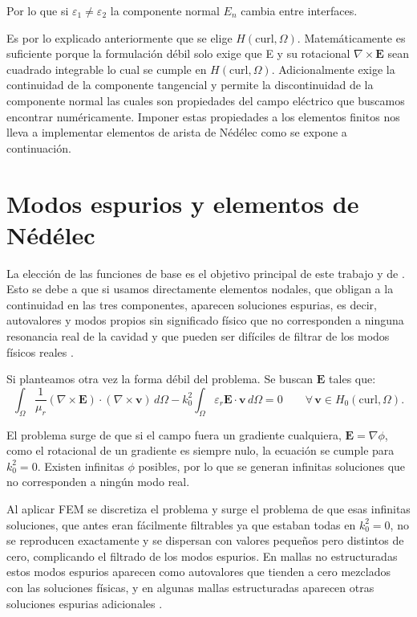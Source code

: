 \documentclass[12pt]{report} %
\begin{document}
Por lo que si $\varepsilon_1\neq\varepsilon_2$ la componente normal $E_n$ cambia entre interfaces.

Es por lo explicado anteriormente que se elige $H(\mathrm{curl},\Omega)$. Matemáticamente es suficiente porque la formulación débil solo exige que E y su rotacional $\nabla\times\mathbf{E}$ sean cuadrado integrable lo cual se cumple en $H(\mathrm{curl},\Omega)$. Adicionalmente exige la continuidad de la componente tangencial y permite la discontinuidad de la componente normal las cuales son propiedades del campo eléctrico que buscamos encontrar numéricamente. Imponer estas propiedades a los elementos finitos nos lleva a implementar elementos de arista de Nédélec como se expone a continuación.

\section{Modos espurios y elementos de Nédélec}\label{sec:nedelec}

La elección de las funciones de base es el objetivo principal de este trabajo y de \cite{amor2023hexahedral}. Esto se debe a que si usamos directamente elementos nodales, que obligan a la continuidad en las tres componentes, aparecen soluciones espurias, es decir, autovalores y modos propios sin significado f\'isico que no corresponden a ninguna resonancia real de la cavidad y que pueden ser difíciles de filtrar de los modos físicos reales \cite{jacobsson2007nedelec}.

Si planteamos otra vez la forma débil del problema. Se buscan $\mathbf{E}$ tales que:
\begin{equation}\label{eq:forma-debil-h0-nedelec}
	\int_\Omega \frac{1}{\mu_r} (\nabla\times\mathbf{E})\cdot(\nabla\times\mathbf{v})\,d\Omega
	- k_0^2 \int_\Omega \varepsilon_r \mathbf{E}\cdot\mathbf{v}\,d\Omega = 0
	\qquad \forall\,\mathbf{v}\in H_0(\mathrm{curl},\Omega).
\end{equation}

El problema surge de que si el campo fuera un gradiente cualquiera, $\mathbf{E}=\nabla\phi$, como el rotacional de un gradiente es siempre nulo, la ecuaci\'on se cumple para $k_0^2=0$. Existen infinitas $\phi$ posibles, por lo que se generan infinitas soluciones que no corresponden a ningún modo real.

Al aplicar FEM se discretiza el problema y surge el problema de que esas infinitas soluciones, que antes eran fácilmente filtrables ya que estaban todas en $k_0^2=0$, no se reproducen exactamente y se dispersan con valores pequeños pero distintos de cero, complicando el filtrado de los modos espurios. En mallas no estructuradas estos modos espurios aparecen como autovalores que tienden a cero mezclados con las soluciones físicas, y en algunas mallas estructuradas aparecen otras soluciones espurias adicionales \cite{jacobsson2007nedelec}.
\end{document}
